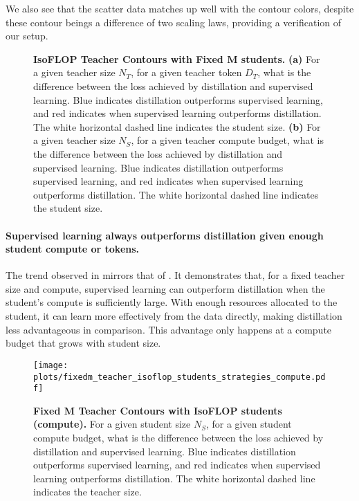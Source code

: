 We also see that the scatter data matches up well with the contour colors, despite these contour beings a difference of two scaling laws, providing a verification of our setup.

\begin{figure}[h]
	\centering
	\caption{\textbf{IsoFLOP Teacher Contours with Fixed $\bm M$ students.}
	\textbf{(a)} For a given teacher size $N_T$, for a given teacher token $D_T$, what is the difference between the loss achieved by distillation and supervised learning. Blue indicates distillation outperforms supervised learning, and red indicates when supervised learning outperforms distillation.
		The white horizontal dashed line indicates the student size. 
	\textbf{(b)} For a given teacher size $N_S$, for a given teacher compute budget, what is the difference between the loss achieved by distillation and supervised learning. Blue indicates distillation outperforms supervised learning, and red indicates when supervised learning outperforms distillation.
		The white horizontal dashed line indicates the student size.}
\end{figure}










\paragraph{Supervised learning always outperforms distillation given enough student compute or tokens.} The trend observed in  mirrors that of . It demonstrates that, for a fixed teacher size and compute, supervised learning can outperform distillation when the student's compute is sufficiently large. With enough resources allocated to the student, it can learn more effectively from the data directly, making distillation less advantageous in comparison.
This advantage only happens at a compute budget that grows with student size.

\begin{figure}[h]
	\centering
	\texttt{[image: plots/fixedm\_teacher\_isoflop\_students\_strategies\_compute.pdf]}
	\caption{\textbf{Fixed $\bm M$ Teacher Contours with IsoFLOP students (compute).} For a given student size $N_S$, for a given student compute budget, what is the difference between the loss achieved by distillation and supervised learning. Blue indicates distillation outperforms supervised learning, and red indicates when supervised learning outperforms distillation.
		The white horizontal dashed line indicates the teacher size.
	}
	\label{fig:fixedm-teacher-isoflop-students-strategies-compute}
\end{figure}

